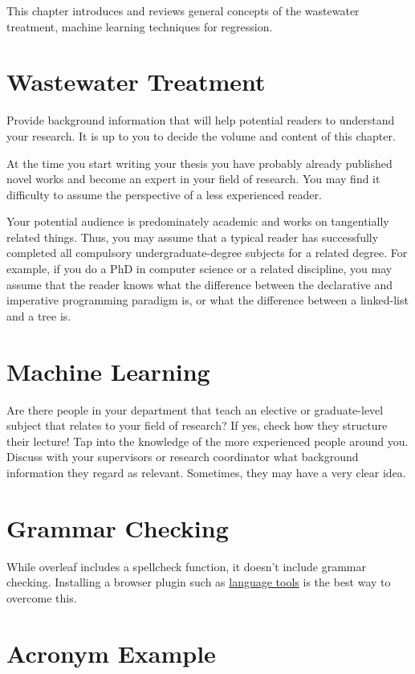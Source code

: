 This chapter introduces and reviews general concepts of the wastewater treatment, machine learning techniques for regression.

\section{Wastewater Treatment}
\label{s:First-Background-Topic}

Provide background information that will help potential readers to understand your research. It is up to you to decide the volume and content of this chapter.

At the time you start writing your thesis you have probably already published novel works and become an expert in your field of research. You may find it difficulty to assume the perspective of a less experienced reader.

Your potential audience is predominately academic and works on tangentially related things. Thus, you may assume that a typical reader has successfully completed all compulsory undergraduate-degree subjects for a related degree. For example, if you do a PhD in computer science or a related discipline, you may assume that the reader knows what the difference between the declarative and imperative programming paradigm is, or what the difference between a linked-list and a tree is.

\section{Machine Learning}
\label{s:Second-Background-Topic}

Are there people in your department that teach an elective or graduate-level subject that relates to your field of research? If yes, check how they structure their lecture! Tap into the knowledge of the more experienced people around you. Discuss with your supervisors or research coordinator what background information they regard as relevant. Sometimes, they may have a very clear idea.

\section{Grammar Checking}
While overleaf includes a spellcheck function, it doesn't include grammar checking. Installing a browser plugin such as \href{https://www.overleaf.com/blog/635-languagetool-a-free-browser-add-on-to-check-your-grammar-and-spelling}{language tools}
 is the best way to overcome this. 
\section{Acronym Example}\label{sec:acro_example}

